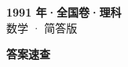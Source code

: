 \documentclass[zihao=-4, a4paper]{ctexart}
\begin{document}
\begin{center}
  {\Large\bfseries 1991 年·全国卷·理科}\\[4pt]
  {\large 数学 · 简答版}
\end{center}
\medskip
{}

\clearpage
{}
\begin{center}{\Large\bfseries 答案速查}\end{center}
\medskip

\end{document}
